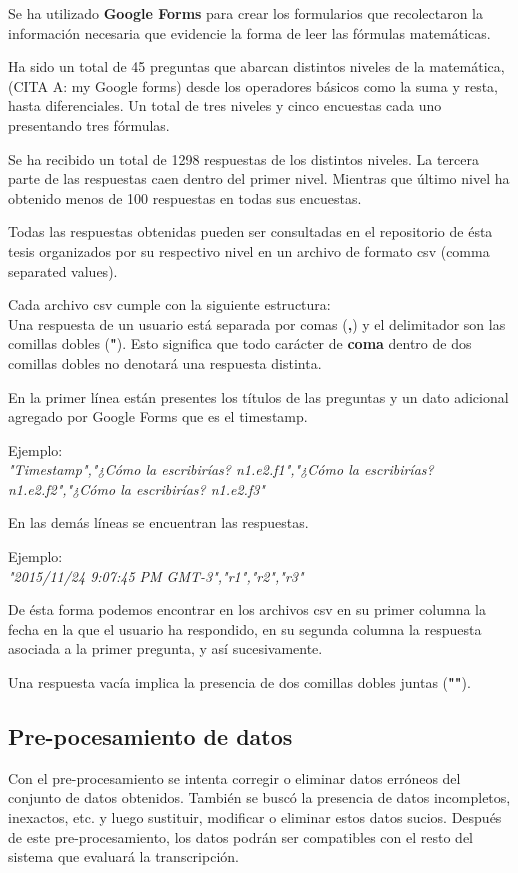 Se ha utilizado \textbf{Google Forms} para crear los formularios que recolectaron la información necesaria que evidencie la forma de leer las fórmulas matemáticas.

Ha sido un total de 45 preguntas que abarcan distintos niveles de la matemática, (CITA A: my Google forms) desde los operadores básicos como la suma y resta, hasta diferenciales. Un total de tres niveles y cinco encuestas cada uno presentando tres fórmulas.

Se ha recibido un total de 1298 respuestas de los distintos niveles. La tercera parte de las respuestas caen dentro del primer nivel. Mientras que último nivel ha obtenido menos de 100 respuestas en todas sus encuestas.

Todas las respuestas obtenidas pueden ser consultadas en el repositorio de ésta tesis organizados por su respectivo nivel en un archivo de formato csv (comma separated values).

Cada archivo csv cumple con la siguiente estructura:\\
Una respuesta de un usuario está separada por comas (\textbf{,}) y el delimitador son las comillas dobles (\textbf{"}). Esto significa que todo carácter de \textbf{coma} dentro de dos comillas dobles no denotará una respuesta distinta.

En la primer línea están presentes los títulos de las preguntas y un dato adicional agregado por Google Forms que es el timestamp.

Ejemplo:\\
\textit{"Timestamp","¿Cómo la escribirías? n1.e2.f1","¿Cómo la escribirías? n1.e2.f2","¿Cómo la escribirías? n1.e2.f3"}

En las demás líneas se encuentran las respuestas.

Ejemplo:\\
\textit{"2015/11/24 9:07:45 PM GMT-3","r1","r2","r3"}

De ésta forma podemos encontrar en los archivos csv en su primer columna la fecha en la que el usuario ha respondido, en su segunda columna la respuesta asociada a la primer pregunta, y así sucesivamente.

Una respuesta vacía implica la presencia de dos comillas dobles juntas (\textbf{""}).

\subsection{Pre-pocesamiento de datos}
Con el pre-procesamiento se intenta corregir o eliminar datos erróneos del conjunto de datos obtenidos. También se buscó la presencia de datos incompletos, inexactos, etc. y luego sustituir, modificar o eliminar estos datos sucios. Después de este pre-procesamiento, los datos podrán ser compatibles con el resto del sistema que evaluará la transcripción.

